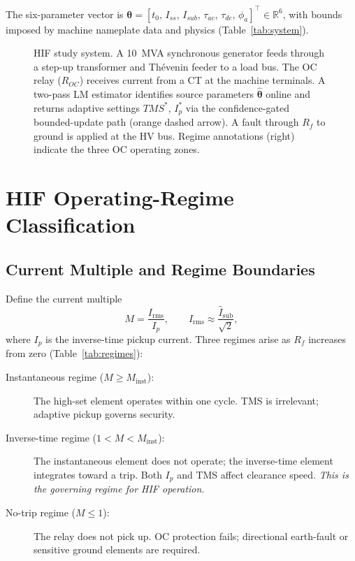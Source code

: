 \documentclass[10pt,journal,twoside]{IEEEtran}
\newcommand{\Rf}{R_{\!f}}
\newcommand{\tmss}{TMS^*}
\begin{document}
The six-parameter vector is
$\bm{\theta} = [t_0,\,I_{ss},\,I_{sub},\,\tau_{ac},\,\tau_{dc},\,\phi_a]^\top
  \in \mathbb{R}^6$,
with bounds imposed by machine nameplate data and physics
(Table~\ref{tab:system}).

\begin{figure}[!t]
\centering

\caption{HIF study system.  A 10~MVA synchronous generator feeds through a
  step-up transformer and Thévenin feeder to a load bus.  The OC relay
  ($R_{OC}$) receives current from a CT at the machine terminals.  A
  two-pass LM estimator identifies source parameters $\hat{\bm{\theta}}$
  online and returns adaptive settings $\tmss$, $I_p^*$ via the confidence-gated
  bounded-update path (orange dashed arrow).  A fault through $\Rf$ to ground
  is applied at the HV bus.  Regime annotations (right) indicate the three
  OC operating zones.}
\label{fig:study_system}
\end{figure}

\section{HIF Operating-Regime Classification}
\label{sec:regime}

\subsection{Current Multiple and Regime Boundaries}
\label{sec:regime:boundaries}

Define the current multiple
\begin{equation}
M = \frac{I_{\mathrm{rms}}}{I_p},
\qquad
I_{\mathrm{rms}} \approx \frac{\hat{I}_{\mathrm{sub}}}{\sqrt{2}},
\label{eq:M}
\end{equation}
where $I_p$ is the inverse-time pickup current.  Three regimes arise as
$\Rf$ increases from zero (Table~\ref{tab:regimes}):

\begin{description}
\item[Instantaneous regime ($M \geq M_{\mathrm{inst}}$):] The high-set
     element operates within one cycle.  TMS is irrelevant; adaptive pickup
     governs security.

\item[Inverse-time regime ($1 < M < M_{\mathrm{inst}}$):] The instantaneous
     element does not operate; the inverse-time element integrates toward
     a trip.  Both $I_p$ and TMS affect clearance speed.
     \emph{This is the governing regime for HIF operation.}

\item[No-trip regime ($M \leq 1$):] The relay does not pick up.
     OC protection fails; directional earth-fault or sensitive ground
     elements are required.
\end{description}
\end{document}
